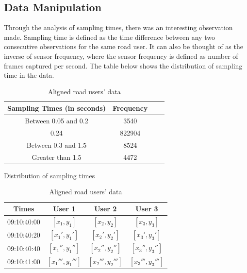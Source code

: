 \documentclass{article}
\begin{document}
\subsection{Data Manipulation}
Through the analysis of sampling times, there was an interesting observation made. Sampling time is defined as the time difference between any two consecutive observations for the same road user. It can also be thought of as the inverse of sensor frequency, where the sensor frequency is defined as number of frames captured per second. The table below shows the distribution of sampling time in the data.



\begin{table}[H]
\parbox{.45\linewidth}{
\centering
\begin{tabular}{@{}cccc@{}}
\toprule
Sampling Times (in seconds) & Frequency\\ \midrule
Between 0.05 and 0.2 & 3540\\ 
0.24 & 822904 \\  
Between 0.3 and 1.5 & 8524 \\  
Greater than 1.5 & 4472 \\

\end{tabular}
\caption{Distribution of sampling times}
\label{table:sampling_time}
}
\hfill
\parbox{.45\linewidth}{
\centering
\begin{tabular}{@{}cccc@{}}
\toprule
Times & User 1 & User 2 & User 3 \\ \midrule
09:10:40:00  & $[x_1,y_1]$ & $[x_2,y_2]$ & $[x_3,y_3]$ \\
09:10:40:20 & $[x_1',y_1']$ & $[x_2',y_2']$ & $[x_3',y_3']$\\
09:10:40:40 & $[x_1'',y_1'']$ & $[x_2'',y_2'']$ & $[x_3'',y_3'']$\\
09:10:41:00 & $[x_1''',y_1''']$ & $[x_2''',y_2''']$ & $[x_3''',y_3''']$\\
\end{tabular}
\caption{Aligned road users' data}
\label{table:common_axis_data}
}
\end{table}
\end{document}
